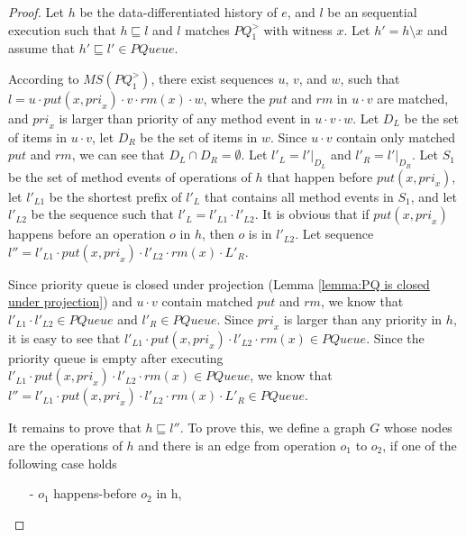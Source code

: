 \begin {proof}

Let $h$ be the data-differentiated history of $e$, and $l$ be an sequential execution such that $h \sqsubseteq l$ and $l$ matches $\textit{PQ}_1^{>}$ with witness $x$. Let $h'=h \setminus x$ and assume that $h' \sqsubseteq l' \in \textit{PQueue}$.

According to $\textit{MS}(\textit{PQ}_1^{>})$, there exist sequences $u$, $v$, and $w$, such that $l=u \cdot \textit{put}(x,\textit{pri}_x) \cdot v \cdot \textit{rm}(x) \cdot w$, where the $\textit{put}$ and $\textit{rm}$ in $u \cdot v$ are matched, and $\textit{pri}_x$ is larger than priority of any method event in $u \cdot v \cdot w$. Let $D_L$ be the set of items in $u \cdot v$, let $D_R$ be the set of items in $w$. Since $u \cdot v$ contain only matched $\textit{put}$ and $\textit{rm}$, we can see that $D_L \cap D_R = \emptyset$. Let $l'_L = l' \vert_{D_L}$ and $l'_R = l' \vert_{D_R}$. Let $S_1$ be the set of method events of operations of $h$ that happen before $\textit{put}(x,\textit{pri}_x)$, let $l'_{L1}$ be the shortest prefix of $l'_L$ that contains all method events in $S_1$, and let $l'_{L2}$ be the sequence such that $l'_L = l'_{L1} \cdot l'_{L2}$. It is obvious that if $\textit{put}(x,\textit{pri}_x)$ happens before an operation $o$ in $h$, then $o$ is in $l'_{L2}$. Let sequence $l'' = l'_{L1} \cdot \textit{put}(x,\textit{pri}_x) \cdot l'_{L2} \cdot \textit{rm}(x) \cdot L'_R$.

Since priority queue is closed under projection (Lemma \ref{lemma:PQ is closed under projection}) and $u \cdot v$ contain matched $\textit{put}$ and $\textit{rm}$, we know that $l'_{L1} \cdot l'_{L2} \in \textit{PQueue}$ and $l'_R \in \textit{PQueue}$. Since $\textit{pri}_x$ is larger than any priority in $h$, it is easy to see that $l'_{L1} \cdot \textit{put}(x,\textit{pri}_x) \cdot l'_{L2} \cdot \textit{rm}(x) \in \textit{PQueue}$. Since the priority queue is empty after executing $l'_{L1} \cdot \textit{put}(x,\textit{pri}_x) \cdot l'_{L2} \cdot \textit{rm}(x) \in \textit{PQueue}$, we know that $l'' = l'_{L1} \cdot \textit{put}(x,\textit{pri}_x) \cdot l'_{L2} \cdot \textit{rm}(x) \cdot L'_R \in \textit{PQueue}$.

It remains to prove that $h \sqsubseteq l''$. To prove this, we define a graph $G$ whose nodes are the operations of $h$ and there is an edge from operation $o_1$ to $o_2$, if one of the following case holds

\begin{itemize}
\setlength{\itemsep}{0.5pt}
\item[-] $o_1$ happens-before $o_2$ in h,


\end{itemize}
\end{proof}
